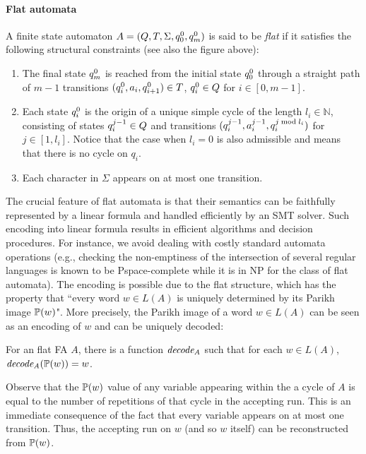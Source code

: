 \documentclass[sigplan,review,anonymous]{acmart}\settopmatter{printfolios=true,printccs=false,printacmref=false}
\begin{document}
\paragraph{Flat automata} 
A finite state automaton  
$A = (Q,T,\Sigma,q_{0}^{0},q_{m}^{0})$ is said to be \emph{flat} if it satisfies the following structural constraints (see also the figure above):
\begin{enumerate}
	\item The final state $q_{m}^{0}$ is reached from  the initial state $q_{0}^{0}$ through a straight path of $m-1$ transitions $(q_{i}^{0},a_i,q_{i+1}^{0}) \in T$, $q_{i}^{0} \in Q$ for $i\in[0,m-1]$. 
	\item  
Each state $q_{i}^{0}$ is the origin of a unique simple cycle of the length $l_i\in\mathbb{N}$, consisting of states $q_{i}^{j-1} \in Q$ and transitions $(q_{i}^{j-1}, a_{i}^{j-1}, q_{i}^{j \bmod l_i})$ for $j\in [1,l_i]$. 
Notice that the case when $l_i = 0$ is also admissible and means that there is no cycle on $q_i$.
	\item Each character in $\Sigma$ appears on at most one transition. 
\end{enumerate} 

The crucial feature of flat automata is that their semantics can be faithfully represented by a linear formula and handled efficiently by an SMT solver. Such encoding into linear formula results in efficient algorithms and decision procedures. For instance, we avoid dealing with costly standard automata operations (e.g., checking  the non-emptiness of the intersection of several regular languages is known to be {\sc Pspace}-complete while it is in {\sc NP} for the class of flat automata).
The encoding is possible due to the flat structure, which has the property that 
``every word $w\in L(A)$ is uniquely determined by its Parikh image $\mathbb{P}{(w)}$". 
More precisely, the Parikh image of a word $w\in L(A)$ can be seen as an encoding of $w$ and can be uniquely decoded:


\begin{lemma}\label{lemma:decoding}
For an flat FA $A$, there is a function $\mathit{decode_{A}}$ such that for each $w\in L(A)$, $\mathit{decode_{A}}(\mathbb{P}{(w)}) = w$. 
\end{lemma}
%
Observe that the $\mathbb{P}{(w)}$ value of any variable appearing within the a cycle of $A$ is equal to the number of repetitions of that cycle in the accepting run. This is an immediate consequence of the fact that 
 every variable appears on at most one transition. Thus, the accepting run on $w$ (and so $w$ itself) can be reconstructed from $\mathbb{P}{(w)}$.  
 
\end{document}
